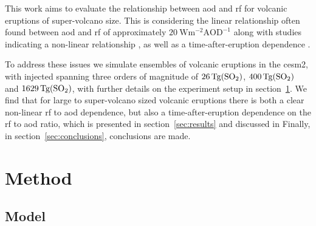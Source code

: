 \documentclass{ametsocV6.1}
\newcommand{\iso}[1][i]{{#1}njected \ce{SO2}}
\begin{document}

This work aims to evaluate the relationship between \gls{aod} and \gls{rf} for volcanic
eruptions of super-volcano size. This is considering the linear relationship often found
between \gls{aod} and \gls{rf} of approximately
\(\SI{20}{\watt\metre^{-2}\mathrm{AOD}^{-1}}\) \citep{gregory2016, marshall2020,
  mills2017, myhre2013} along with studies indicating a non-linear relationship
\citep{niemeier2015}, as well as a time-after-eruption dependence \citep{marshall2020}.

To address these issues we simulate ensembles of volcanic eruptions in the \gls{cesm2},
with \iso{} spanning three orders of magnitude of \(\SI{26}{\tera\gram(\ce{SO2})}\),
\(\SI{400}{\tera\gram(\ce{SO2})}\) and \(\SI{1629}{\tera\gram(\ce{SO2})}\), with further
details on the experiment setup in section~\ref{sec:method}. We find that for large to
super-volcano sized volcanic eruptions there is both a clear non-linear \gls{rf} to
\gls{aod} dependence, but also a time-after-eruption dependence on the \gls{rf} to
\gls{aod} ratio, which is presented in section~\ref{sec:results} and discussed in
Finally, in section~\ref{sec:conclusions}, conclusions are made.
\section{Method}\label{sec:method}

\subsection{Model}
\end{document}
